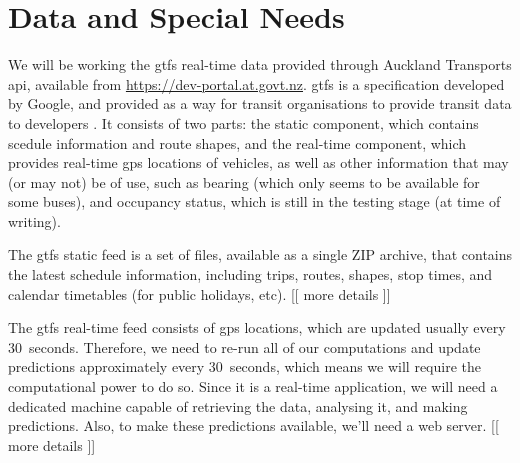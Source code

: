 \documentclass[12pt,a4paper]{article}
\begin{document}




\section{Data and Special Needs}
\label{sec:data}

We will be working the \gls{gtfs} real-time data provided through Auckland Transports
\gls{api}, available from \url{https://dev-portal.at.govt.nz}.
\gls{gtfs} is a specification developed by Google,
and provided as a way for transit organisations to provide transit data to developers
\citep{gtfs}.
It consists of two parts: the static component, which contains scedule information and route shapes,
and the real-time component, which provides real-time \gls{gps} locations of vehicles,
as well as other information that may (or may not) be of use,
such as bearing (which only seems to be available for some buses),
and occupancy status, which is still in the testing stage (at time of writing).


The \gls{gtfs} static feed is a set of files, available as a single ZIP archive,
that contains the latest schedule information, including trips, routes, shapes, stop times,
and calendar timetables (for public holidays, etc).
[[ more details ]]


The \gls{gtfs} real-time feed consists of \gls{gps} locations,
which are updated usually every 30~seconds.
Therefore, we need to re-run all of our computations and update predictions approximately
every 30~seconds, which means we will require the computational power to do so.
Since it is a real-time application, we will need a dedicated machine capable of
retrieving the data, analysing it, and making predictions.
Also, to make these predictions available, we'll need a web server.
[[ more details ]]
\end{document}
